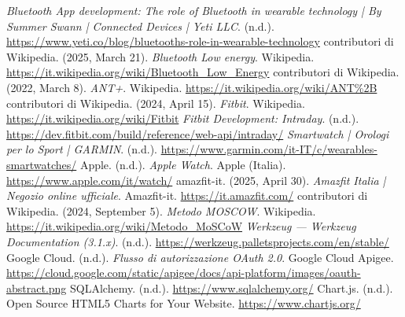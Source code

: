 \documentclass[12pt,a4paper,oneside]{report}
\begin{document}
\begin{thebibliography}{99}
     \textit{Bluetooth App development: The role of Bluetooth in wearable technology | By Summer Swann | Connected Devices | Yeti LLC}. (n.d.). \url{https://www.yeti.co/blog/bluetooths-role-in-wearable-technology}
     contributori di Wikipedia. (2025, March 21). \textit{Bluetooth Low energy}. Wikipedia. \url{https://it.wikipedia.org/wiki/Bluetooth_Low_Energy}
     contributori di Wikipedia. (2022, March 8). \textit{ANT+}. Wikipedia. \url{https://it.wikipedia.org/wiki/ANT%2B}
     contributori di Wikipedia. (2024, April 15). \textit{Fitbit}. Wikipedia. \url{https://it.wikipedia.org/wiki/Fitbit}
     \textit{Fitbit Development: Intraday}. (n.d.). \url{https://dev.fitbit.com/build/reference/web-api/intraday/}
     \textit{Smartwatch | Orologi per lo Sport | GARMIN}. (n.d.). \url{https://www.garmin.com/it-IT/c/wearables-smartwatches/}
     Apple. (n.d.). \textit{Apple Watch}. Apple (Italia). \url{https://www.apple.com/it/watch/}
     amazfit-it. (2025, April 30). \textit{Amazfit Italia | Negozio online ufficiale}. Amazfit-it. \url{https://it.amazfit.com/}
     contributori di Wikipedia. (2024, September 5). \textit{Metodo MOSCOW}. Wikipedia. \url{https://it.wikipedia.org/wiki/Metodo_MoSCoW}
     \textit{Werkzeug — Werkzeug Documentation (3.1.x)}. (n.d.). \url{https://werkzeug.palletsprojects.com/en/stable/}
     Google Cloud. (n.d.). \textit{Flusso di autorizzazione OAuth 2.0}. Google Cloud Apigee. \url{https://cloud.google.com/static/apigee/docs/api-platform/images/oauth-abstract.png}
     SQLAlchemy. (n.d.). \url{https://www.sqlalchemy.org/}
     Chart.js. (n.d.). Open Source HTML5 Charts for Your Website. \url{https://www.chartjs.org/}
\end{thebibliography}
\end{document}
